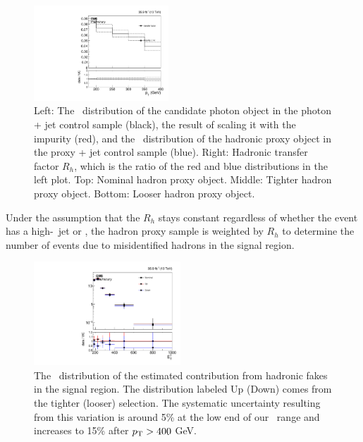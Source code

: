 \begin{figure}[htbp]
\begin{center}
    \includegraphics[width=0.45\textwidth]{Analysis/Figures/hfake/tfactorLoose.pdf}
    \caption{
      Left: The \pt\ distribution of the candidate photon object in the photon + jet control sample (black), the result of scaling it with the impurity (red), and the \pt\ distribution of the hadronic proxy object in the proxy + jet control sample (blue).
      Right: Hadronic transfer factor $R_{h}$, which is the ratio of the red and blue distributions in the left plot. 
      Top: Nominal hadron proxy object. 
      Middle: Tighter hadron proxy object. 
      Bottom: Looser hadron proxy object.
    }
    \label{fig:hadronTFactor}
  \end{center}
\end{figure}


Under the assumption that the $R_{h}$ stays constant regardless of whether the event has a high-\pt\ jet or \met, the hadron proxy sample is weighted by $R_{h}$ to determine the number of events due to misidentified hadrons in the signal region.

\begin{figure}[htbp]
  \begin{center}
    \includegraphics[width=0.49\textwidth]{Analysis/Figures/hfake/shape_sample.pdf}
    \caption{
      The \pt\ distribution of the estimated contribution from hadronic fakes in the signal region. 
      The distribution labeled Up (Down) comes from the tighter (looser) selection. 
      The systematic uncertainty resulting from this variation is around 5\% at the low end of our \pt\ range and increases to 15\% after $p_{\mathrm{T}} > 400$ GeV.
    }
    \label{fig:hadronFakeShapes}
  \end{center}
\end{figure}


